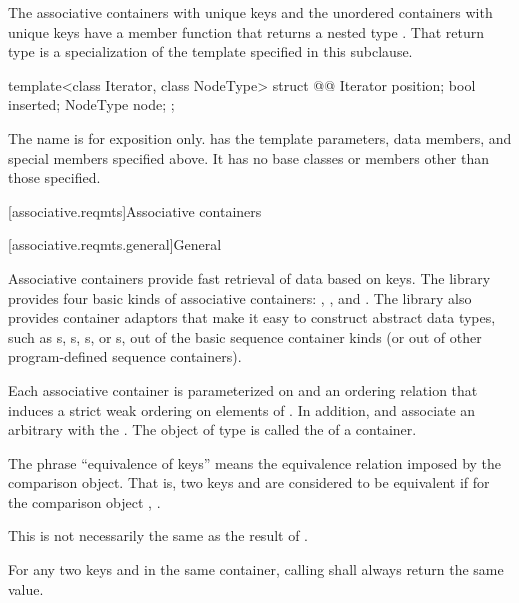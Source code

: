 \pnum
The associative containers with unique keys and the unordered containers with unique keys
have a member function  that returns a nested type .
That return type is a specialization of the template specified in this subclause.

\begin{codeblock}
template<class Iterator, class NodeType>
struct @@
{
  Iterator position;
  bool     inserted;
  NodeType node;
};
\end{codeblock}

\pnum
The name  is for exposition only.
 has the template parameters,
data members, and special members specified above.
It has no base classes or members other than those specified.

[associative.reqmts]{Associative containers}

[associative.reqmts.general]{General}

\pnum
Associative containers provide fast retrieval of data based on keys.
The library provides four basic kinds of associative containers:
,
,
and
.
The library also provides container adaptors
that make it easy to construct abstract data types,
such as s, s,
s, or s,
out of the basic sequence container kinds
(or out of other program-defined sequence containers).

\pnum
Each associative container is parameterized on
and an ordering relation
that induces a strict weak ordering on
elements of
.
In addition,
and
associate an arbitrary 
with the
.
The object of type
is called the
of a container.

\pnum
The phrase ``equivalence of keys'' means the equivalence relation imposed by the
comparison object.
That is, two keys
and
are considered to be equivalent if for the
comparison object
,
.
\begin{note}
This is not necessarily the same as the result of .
\end{note}
For any two keys
and
in the same container, calling
shall always return the same value.


